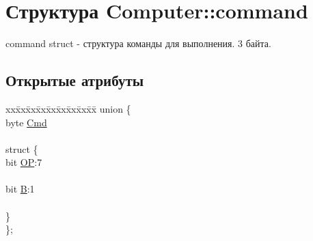 \hypertarget{struct_computer_1_1command}{}\section{Структура Computer\+:\+:command}
\label{struct_computer_1_1command}


command struct -\/ структура команды для выполнения. 3 байта.  


\subsection*{Открытые атрибуты}
\begin{DoxyCompactItemize}
\item 
\hypertarget{struct_computer_1_1command_abab9a57c8c7fcd2f70c6a3e082e29032}{}\label{struct_computer_1_1command_abab9a57c8c7fcd2f70c6a3e082e29032} 
\begin{tabbing}
xx\=xx\=xx\=xx\=xx\=xx\=xx\=xx\=xx\=\kill
union \{\\
\>byte \hyperlink{struct_computer_1_1command_afd02c65efae303e5c528aab2eaa17556}{Cmd}\\
\>\\
\hypertarget{union_computer_1_1command_1_1_0D0_ab80c892093be4d5b8271cb0ea2275b90}{}\label{union_computer_1_1command_1_1_0D0_ab80c892093be4d5b8271cb0ea2275b90} 
\>struct \{\\
\>\>bit \hyperlink{struct_computer_1_1command_a2714eda12dcfba46770769c7ed9c7f0a}{OP}:7\\
\>\>\\
\>\>bit \hyperlink{struct_computer_1_1command_a3e0d1e527de9f60594023a362b08a7de}{B}:1\\
\>\>\\
\>\} \\
\}; \\


\end{tabbing}
\end{DoxyCompactItemize}

